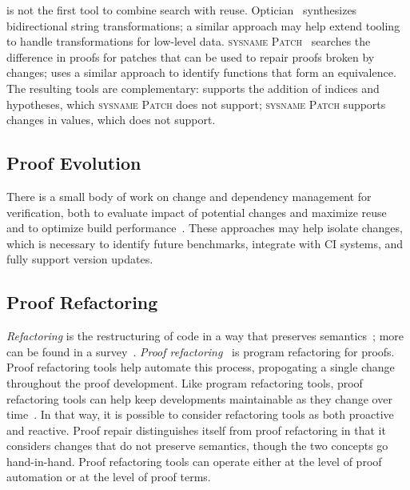 \toolnameb is not the first tool to combine search with reuse. 
Optician~\cite{miltner2017synthesizing} synthesizes bidirectional string transformations;
a similar approach may help extend tooling to handle transformations for low-level data.
\textsc{sysname Patch}~\cite{ringer2018adapting} 
searches the difference in proofs for patches that can be used to repair proofs broken by changes;
\toolnameb uses a similar approach to identify functions
that form an equivalence. The resulting tools are complementary: \toolnameb supports the addition
of indices and hypotheses, which \textsc{sysname Patch} does not support; \textsc{sysname Patch} supports changes
in values, which \toolnameb does not support. 

\subsection*{Proof Evolution}


There is a small body of work on change and dependency management for verification,
both to evaluate impact of potential changes and maximize reuse~\cite{873647, Autexier:2010:CMH:1986659.1986663}
and to optimize build performance~\cite{Celik:2017:IRP:3155562.3155588}.
These approaches may help isolate changes, which is necessary to identify future benchmarks, integrate
with CI systems, and fully support version updates.

\subsection*{Proof Refactoring}


\textit{Refactoring} is the restructuring of code in a way that preserves semantics~\cite{opdyke1992refactoring};
more can be found in a survey~\cite{mens2004survey}.
\textit{Proof refactoring}~\cite{WhitesidePhD} is program refactoring for proofs.
Proof refactoring tools help automate this process, propogating a single change throughout the proof development.
Like program refactoring tools, proof refactoring tools can help keep developments
maintainable as they change over time~\cite{Bourke12}. In that way, it is possible to consider refactoring tools 
as both proactive and reactive.
Proof repair distinguishes itself from proof refactoring in that it considers changes that do not
preserve semantics, though the two concepts go hand-in-hand.
Proof refactoring tools can operate either at the level of proof automation or at the level of proof terms.

